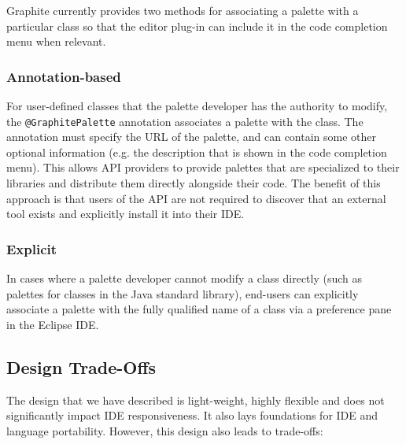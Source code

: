 \documentclass[10pt, conference, compsocconf]{IEEEtran}
\begin{document}
Graphite currently provides two methods for associating a palette with a particular class so that the editor plug-in can include it in the code completion menu when relevant.

\subsubsection{Annotation-based}
For user-defined classes that the palette developer has the authority to modify, the \texttt{@GraphitePalette} annotation associates a palette with the class. The annotation must specify the URL of the palette, and can contain some other optional information (e.g. the description that is shown in the code completion menu). This  allows API providers to provide palettes that are specialized to their libraries and distribute them directly alongside their code. The benefit of this approach is that users of the API are not required to discover that an external tool exists and explicitly install it into their IDE.

\subsubsection{Explicit}
In cases where a palette developer cannot modify a class directly (such as palettes for classes in the Java standard library), end-users can explicitly associate a palette with the fully qualified name of a class via a preference pane in the Eclipse IDE.

\subsection{Design Trade-Offs}
The design that we have described is light-weight, highly flexible and does not significantly impact IDE responsiveness. It also lays foundations for IDE and language portability. However, this design also leads to trade-offs:
\end{document}
